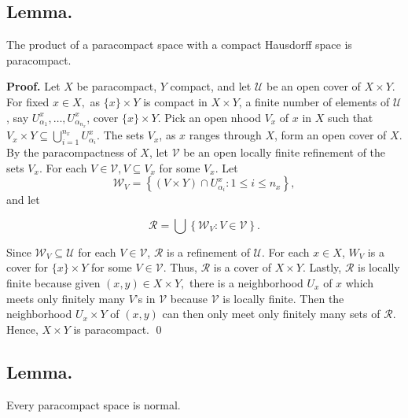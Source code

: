 \documentclass{article}
\begin{document}
\vskip 20pt

\subsection{Lemma.} The product of a paracompact space with a compact Hausdorff space is paracompact.

\vskip 10pt

\textbf{Proof.} Let $X$ be paracompact, $Y$ compact, and let $\mathcal{U}$ be an open cover of $X\times Y$. For fixed $x\in X,$ as $\{x\}\times Y$ is compact in $X\times Y$, a finite number of elements of $\mathcal{U}$, say $U_{\alpha_1}^x, \dots , U_{\alpha_{n_x}}^x$, cover $\{x\}\times Y$. Pick an open nhood $V_x$ of $x$ in $X$ such that $V_x\times Y\subseteq \bigcup_{i=1}^{n_x} U_{\alpha_i}^x.$ 
\vskip 10pt
The sets $V_x$, as $x$ ranges through $X$, form an open cover of $X$. By the paracompactness of $X$, let $\mathcal{V}$ be an open locally finite refinement of the sets $V_x$. For each $V\in \mathcal{V}, V\subseteq V_x$ for some $V_x$. 
Let $$\mathcal{W}_V=\left\{(V\times Y)\cap U_{\alpha_i}^x: 1\leq i\leq n_x\right\},$$ and let 

$$\mathcal{R}=\bigcup \left\{\mathcal{W}_V: V\in \mathcal{V}\right\}.$$

\vskip 5pt

Since $\mathcal{W}_V\subseteq \mathcal{U}$ for each $V\in \mathcal{V}$, $\mathcal{R}$ is a refinement of $\mathcal{U}$. For each $x\in X$, $W_V$ is a cover for $\{x\}\times Y$ for some $V\in \mathcal{V}$. Thus, $\mathcal{R}$ is a cover of $X\times Y$. Lastly, $\mathcal{R}$ is locally finite because given $(x,y)\in X\times Y,$ there is a neighborhood $U_x$ of $x$ which meets only finitely many $V$'s in $\mathcal{V}$ because $\mathcal{V}$ is locally finite. Then the neighborhood $U_x\times Y$ of $(x,y)$ can then only meet only finitely many sets of $\mathcal{R}$. Hence, $X\times Y$ is paracompact.  \qed


\vskip 40pt


\subsection{Lemma.}  Every paracompact space is normal. 

\vskip 10pt
\end{document}
